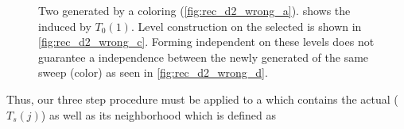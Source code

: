      \begin{figure}[thbp]
     	\centering
     	\hspace{0.6em}
     	\hspace{0.6em}
     	\hspace{0.6em}
     	\caption{Two \levelGroups generated by a \DTWO coloring (\cref{fig:rec_d2_wrong_a}).  shows the \subgraph induced by \levelGroup $T_0(1)$. Level construction on the selected \subgraph is shown in \cref{fig:rec_d2_wrong_c}. Forming \DTWO independent \levelGroups on these levels does not guarantee a \DTWO independence between the newly generated \levelGroups of the same sweep (color) as seen in \cref{fig:rec_d2_wrong_d}.}
     	\label{fig:rec_d2_wrong}
     \end{figure}
Thus, our three step procedure must be applied to a \subgraph which contains the actual \levelGroup ($T_s(j)$) as well as its \DKM neighborhood which is defined as 
